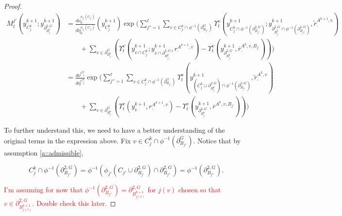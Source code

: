 \documentclass[12pt]{article}
\newcommand{\ov}{\overline}
\newcommand{\tr}{\textcolor{red}}
\newcommand{\gneigh}[2]{\partial^{#1}_{#2}}			%
\newcommand{\dgneigh}[2]{\partial^{2,#1}_{#2}}		%
\newcommand{\cl}[1]{\ov{#1}}						%
\newcommand{\indx}[1]{^{#1}}						%
\newcommand{\rate}{r}								%
\newcommand{\vind}[1]{_{#1}}						%
\newcommand{\vpara}[1]{^{#1}}						%
\newcommand{\stpara}[1]{_{#1}}						%
\newcommand{\tpara}[1]{_{#1}}						%
\newcommand{\gvpara}[2]{^{#1,#2}}					%
\newcommand{\psize}{\ell}							%
\newcommand{\Xg}{Y}									%
\newcommand{\brate}{\alt{\rate}}					%
\newcommand{\alt}[1]{\tilde{#1}}					%
\newcommand{\mm}{\nu}								%
\newcommand{\bgrate}{\ov{\rate}}					%
\newcommand{\mmm}{\eta}								%
\newcommand{\ds}{\Upsilon}							%
\newcommand{\mdense}{M}								%
\newcommand{\xg}{y}									%
\newcommand{\gvjpara}[3]{^{#1,#2,#3}}				%
\newcommand{\jpara}[1]{^{#1}}						%
\begin{document}
\begin{proof}
\begin{align*}
\mdense\jpara{j'}\tpara{t}\left(\xg\indx{k+1}\vind{C_j\indx{k}};\xg\indx{k+1}\vind{\dgneigh{G}{B\indx{k}_j}}\right) &= \frac{d\mm\vpara{\phi_{j'}(C_{j'})}\tpara{0}}{d\mmm\vpara{\phi_{j'}(C_{j'})}\tpara{0}}(\xg\indx{k+1}\vind{C\indx{k}_j})\exp\Bigg(\sum_{j'' = 1}^{\psize}\sum_{v \in C_j\indx{k}\cap\phi^{-1}(\gneigh{G}{B_{j''}})} \ds\vpara{v}\tpara{t}\left(\xg\indx{k+1}\vind{C_j\indx{k}\cap\phi^{-1}(\dgneigh{G}{B_{j''}})};\xg\indx{k+1}\vind{\dgneigh{G}{B_j\indx{k}}\cap\phi^{-1}(\dgneigh{G}{B_{j''}})},\brate\gvpara{A\indx{k+1}}{v}\stpara{\cdot}\right)\\
&\hspace{24pt} + \sum_{v \in \gneigh{G}{B_j\indx{k}}} \left(\ds\vpara{v}\tpara{t}\left(\xg\indx{k+1}\vind{\cl{v}\cap C_j\indx{k}};\xg\indx{k+1}\vind{\cl{v}\cap\dgneigh{G}{B_j\indx{k}}},\rate\gvpara{A\indx{k+1}}{v}\stpara{\cdot}\right) - \ds\vpara{v}\tpara{t}\left(\xg\indx{k+1}\vind{\dgneigh{G}{B_j\indx{k}}},\bgrate\gvjpara{A\indx{k}}{v}{B_{j'}}\stpara{\cdot}\right)\right)\Bigg)\\
&= \frac{d\mm\vpara{C_j\indx{k}}}{d\mmm\vpara{C_j\indx{k}}}\exp\Bigg(\sum_{j'' =1}^{\psize}\sum_{v \in C_j\indx{k}\cap\phi^{-1}(\gneigh{G}{B_{j''}})} \ds\vpara{v}\tpara{t}\left(\xg\indx{k+1}\vind{\left(C_j\indx{k}\cup\dgneigh{G}{B_j\indx{k}}\right)\cap\phi^{-1}(\dgneigh{G}{B_{j''}})},\brate\gvpara{A\indx{k}}{v}\stpara{\cdot}\right)\\
&\hspace{24pt} + \sum_{v \in \gneigh{G}{B_j\indx{k}}}\left(\ds\vpara{v}\tpara{t}\left(\xg\indx{k+1}\vind{\cl{v}},\rate\gvpara{A\indx{k+1}}{v}\stpara{\cdot}\right) - \ds\vpara{v}\tpara{t}\left(\xg\indx{k+1}\vind{\dgneigh{G}{B_j\indx{k}}},\bgrate\gvjpara{A\indx{k}}{v}{B_{j'}}\right)\right)\Bigg)
\end{align*}

To further understand this, we need to have a better understanding of the original terms in the expression above. Fix \(v \in C_j\indx{k}\cap \phi^{-1}(\gneigh{G}{B_{j''}})\). Notice that by assumption \ref{a::admissible},

\[C_j\indx{k}\cap \phi^{-1}(\dgneigh{G}{B_{j''}}) = \phi^{-1}\left(\phi_{j'}\left(C_{j'}\cup\dgneigh{G}{B_{j'}}\right)\cap \dgneigh{G}{B_{j''}}\right) = \phi^{-1}\left(\dgneigh{G}{B_{j''}}\right).\]

\tr{I'm assuming for now that \(\phi^{-1}(\dgneigh{G}{B_{j''}}) = \dgneigh{G}{B_{j(v)}\indx{k+1}}\) for \(j(v)\) chosen so that \(v \in \dgneigh{G}{B_{j(v)}\indx{k+1}}\). Double check this later.}



\end{proof}
\end{document}
